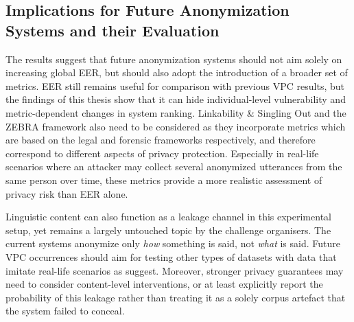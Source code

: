 \documentclass[12pt,leqno,a4paper]{article}
\begin{document}
\subsection{Implications for Future Anonymization Systems and their Evaluation}
\label{subsubsec:implications_for_future_systems}

The results suggest that future anonymization systems should not aim solely on increasing global EER, but should also adopt the introduction of a broader set of metrics. 
EER still remains useful for comparison with previous VPC results, but the findings of this thesis show that it can hide individual-level vulnerability and metric-dependent changes in system ranking. 
Linkability \& Singling Out and the ZEBRA framework also need to be considered as they incorporate metrics which are based on the legal and forensic frameworks respectively,
and therefore correspond to different aspects of privacy protection. Especially in real-life scenarios where an attacker may collect several anonymized utterances from the same person over time, these metrics provide a more
realistic assessment of privacy risk than EER alone.

Linguistic content can also function as a leakage channel in this experimental setup, yet remains a largely untouched topic by the challenge organisers. The current systems anonymize only \emph{how} something is said, not \emph{what} is
said. Future VPC occurrences should aim for testing other types of datasets with data that imitate real-life scenarios as \cite{franzreb_content_2026} suggest. Moreover, stronger privacy guarantees may need to consider content-level interventions, or at least explicitly report the probability of this leakage rather
than treating it as a solely corpus artefact that the system failed to conceal.
\end{document}
